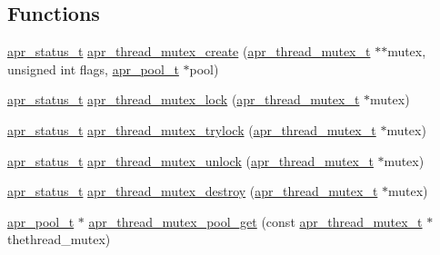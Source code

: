 \subsection*{Functions}
\begin{DoxyCompactItemize}
\item 
\hyperlink{group__apr__errno_gaf76ee4543247e9fb3f3546203e590a6c}{apr\+\_\+status\+\_\+t} \hyperlink{group__apr__thread__mutex_ga927e99580a669f577fbcb6508814ff12}{apr\+\_\+thread\+\_\+mutex\+\_\+create} (\hyperlink{group__apr__thread__mutex_ga95712060ba3a192036416e1ccef1db75}{apr\+\_\+thread\+\_\+mutex\+\_\+t} $\ast$$\ast$mutex, unsigned int flags, \hyperlink{group__apr__pools_gaf137f28edcf9a086cd6bc36c20d7cdfb}{apr\+\_\+pool\+\_\+t} $\ast$pool)
\item 
\hyperlink{group__apr__errno_gaf76ee4543247e9fb3f3546203e590a6c}{apr\+\_\+status\+\_\+t} \hyperlink{group__apr__thread__mutex_ga1430fd10d8d260c0e3832c959742a977}{apr\+\_\+thread\+\_\+mutex\+\_\+lock} (\hyperlink{group__apr__thread__mutex_ga95712060ba3a192036416e1ccef1db75}{apr\+\_\+thread\+\_\+mutex\+\_\+t} $\ast$mutex)
\item 
\hyperlink{group__apr__errno_gaf76ee4543247e9fb3f3546203e590a6c}{apr\+\_\+status\+\_\+t} \hyperlink{group__apr__thread__mutex_ga6ac9c8ebee83ff89416f00231a858798}{apr\+\_\+thread\+\_\+mutex\+\_\+trylock} (\hyperlink{group__apr__thread__mutex_ga95712060ba3a192036416e1ccef1db75}{apr\+\_\+thread\+\_\+mutex\+\_\+t} $\ast$mutex)
\item 
\hyperlink{group__apr__errno_gaf76ee4543247e9fb3f3546203e590a6c}{apr\+\_\+status\+\_\+t} \hyperlink{group__apr__thread__mutex_ga74e58f753737283f9b826d8cdcbcb4bf}{apr\+\_\+thread\+\_\+mutex\+\_\+unlock} (\hyperlink{group__apr__thread__mutex_ga95712060ba3a192036416e1ccef1db75}{apr\+\_\+thread\+\_\+mutex\+\_\+t} $\ast$mutex)
\item 
\hyperlink{group__apr__errno_gaf76ee4543247e9fb3f3546203e590a6c}{apr\+\_\+status\+\_\+t} \hyperlink{group__apr__thread__mutex_gae80e6f9c2a2fbaa94f5a6954e02118f4}{apr\+\_\+thread\+\_\+mutex\+\_\+destroy} (\hyperlink{group__apr__thread__mutex_ga95712060ba3a192036416e1ccef1db75}{apr\+\_\+thread\+\_\+mutex\+\_\+t} $\ast$mutex)
\item 
\hyperlink{group__apr__pools_gaf137f28edcf9a086cd6bc36c20d7cdfb}{apr\+\_\+pool\+\_\+t} $\ast$ \hyperlink{group__apr__thread__mutex_gafec9362d92f8bd67660b97cb3c246544}{apr\+\_\+thread\+\_\+mutex\+\_\+pool\+\_\+get} (const \hyperlink{group__apr__thread__mutex_ga95712060ba3a192036416e1ccef1db75}{apr\+\_\+thread\+\_\+mutex\+\_\+t} $\ast$thethread\+\_\+mutex)
\end{DoxyCompactItemize}


